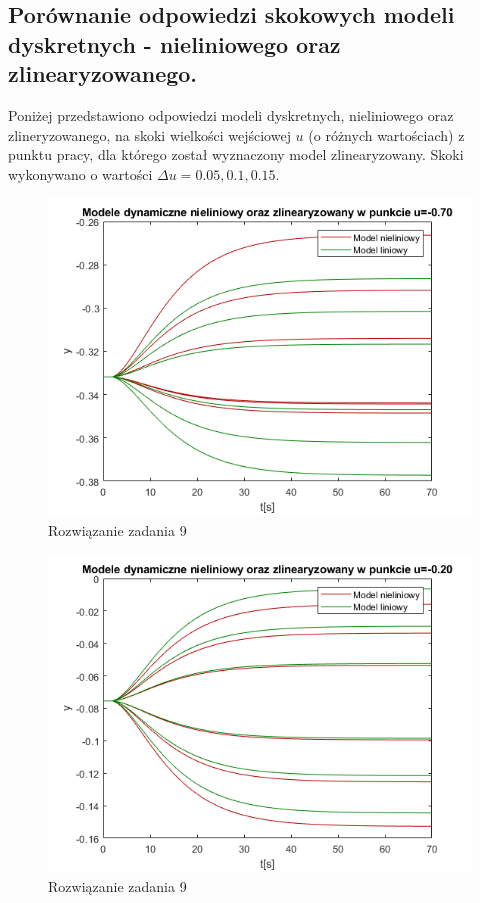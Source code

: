 \subsection{Porównanie odpowiedzi skokowych modeli dyskretnych - nieliniowego oraz zlinearyzowanego.}
Poniżej przedstawiono odpowiedzi modeli dyskretnych, nieliniowego oraz zlineryzowanego, na skoki wielkości wejściowej $u$ (o różnych wartościach) z punktu pracy, dla którego został wyznaczony model zlinearyzowany. Skoki wykonywano o wartości $\Delta u=0.05,0.1,0.15$.
\begin{figure}[H]
\centering
\includegraphics[width=15cm]{images/10.png}
\caption{Rozwiązanie zadania 9}
\label{fig:10}
\end{figure}
\begin{figure}[H]
\centering
\includegraphics[width=15cm]{images/11.png}
\caption{Rozwiązanie zadania 9}
\label{fig:11}
\end{figure}
